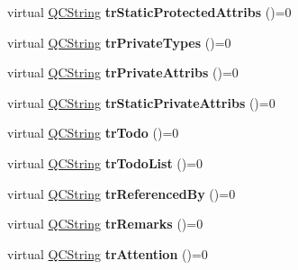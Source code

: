 \begin{DoxyCompactItemize}
\item 
\hypertarget{class_translator_a2ddf8946635747f8b9edca9e4aa34bf3}{virtual \hyperlink{class_q_c_string}{Q\-C\-String} {\bfseries tr\-Static\-Protected\-Attribs} ()=0}\label{class_translator_a2ddf8946635747f8b9edca9e4aa34bf3}

\item 
\hypertarget{class_translator_ace82400748d08102fec190d5e6655ab3}{virtual \hyperlink{class_q_c_string}{Q\-C\-String} {\bfseries tr\-Private\-Types} ()=0}\label{class_translator_ace82400748d08102fec190d5e6655ab3}

\item 
\hypertarget{class_translator_a5f84b790002af16bdecc1e16940746b3}{virtual \hyperlink{class_q_c_string}{Q\-C\-String} {\bfseries tr\-Private\-Attribs} ()=0}\label{class_translator_a5f84b790002af16bdecc1e16940746b3}

\item 
\hypertarget{class_translator_a62afa4582c64f416523943a8e317d306}{virtual \hyperlink{class_q_c_string}{Q\-C\-String} {\bfseries tr\-Static\-Private\-Attribs} ()=0}\label{class_translator_a62afa4582c64f416523943a8e317d306}

\item 
\hypertarget{class_translator_a01ed96438839f3a29dbecb4e726bf839}{virtual \hyperlink{class_q_c_string}{Q\-C\-String} {\bfseries tr\-Todo} ()=0}\label{class_translator_a01ed96438839f3a29dbecb4e726bf839}

\item 
\hypertarget{class_translator_abf0cdecf86a74c3861e05de360a97003}{virtual \hyperlink{class_q_c_string}{Q\-C\-String} {\bfseries tr\-Todo\-List} ()=0}\label{class_translator_abf0cdecf86a74c3861e05de360a97003}

\item 
\hypertarget{class_translator_a804ea39df9fcd9ffbd3950a57e2b1707}{virtual \hyperlink{class_q_c_string}{Q\-C\-String} {\bfseries tr\-Referenced\-By} ()=0}\label{class_translator_a804ea39df9fcd9ffbd3950a57e2b1707}

\item 
\hypertarget{class_translator_a493c99cefe6ca5f47741ed581cb7804b}{virtual \hyperlink{class_q_c_string}{Q\-C\-String} {\bfseries tr\-Remarks} ()=0}\label{class_translator_a493c99cefe6ca5f47741ed581cb7804b}

\item 
\hypertarget{class_translator_aa1f3f6b615b343c44c169e763a0425d6}{virtual \hyperlink{class_q_c_string}{Q\-C\-String} {\bfseries tr\-Attention} ()=0}\label{class_translator_aa1f3f6b615b343c44c169e763a0425d6}


\end{DoxyCompactItemize}
